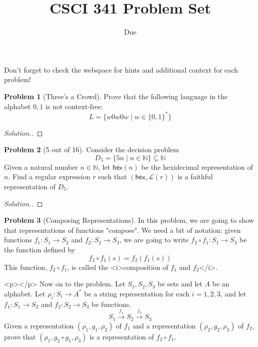 \documentclass[11pt]{article}
\title{CSCI 341 Problem Set \pset}
\author{\subtitle}
\date{Due
    \duedate
}
\theoremstyle{theorem} %
\theoremstyle{definition} %
\newtheorem{problem}                    {{\color{BurntOrange}Problem}}
\theoremstyle{remark} %
\begin{document}
\maketitle

Don't forget to check the webspace for hints and additional context for each problem!

\begin{problem}
    [Three's a Crowd]
    Prove that the following language in the alphabet \(0,1\) is not context-free:
    \[
        L = \{w 0 w 0 w \mid w \in \{0,1\}^*\}
    \]
\end{problem}

\begin{proof}[Solution.]
    
\end{proof}

\begin{problem}
    [5 out of 16]
    Consider the decision problem 
    \[
        D_5 = \{5n \mid n \in \mathbb N\} \subseteq \mathbb{N}
    \]
    Given a natural number \(n\in \mathbb N\), let \(\mathsf{hex}(n)\) be the hexidecimal representation of \(n\). 
    Find a regular expression \(r\) such that \((\mathsf{hex}, \mathcal L(r))\) is a faithful representation of \(D_5\).
\end{problem}

\begin{proof}[Solution.]
    
\end{proof}

\begin{problem}
    [Composing Representations]
    In this problem, we are going to show that representations of functions "compose".
    We need a bit of notation: given functions \(f_1 \colon S_1 \to S_2\) and \(f_2 \colon S_2 \to S_3\), we are going to write \(f_2 \circ f_1 \colon S_1 \to S_3\) be the function defined by 
    \[
        f_2 \circ f_1(s) = f_2(f_1(s))
    \]
    This function, \(f_2 \circ f_1\), is called the <i>composition of \(f_1\) and \(f_2\)</i>.

    <p></p>
    Now on to the problem.
    Let \(S_1,S_2,S_3\) be sets and let \(A\) be an alphabet.
    Let \(\rho_i \colon S_i \to A^*\) be a string representation for each \(i = 1,2,3\), and let \(f_1 \colon S_1 \to S_2\) and \(f_2 \colon S_2 \to S_3\) be functions. 
    \[
        S_1 \xrightarrow{f_1} S_2 \xrightarrow{f_2} S_3
    \]
    Given a representation \((\rho_1, g_1, \rho_2)\) of \(f_1\) and a representation \((\rho_2, g_2, \rho_3)\) of \(f_2\), prove that \((\rho_1, g_2 \circ g_1, \rho_3)\) is a representation of \(f_2 \circ f_1\).
\end{problem}
\end{document}

